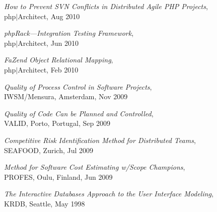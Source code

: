 \documentclass[12pt]{article}
\begin{document}
\emph{How to Prevent SVN Conflicts in Distributed Agile PHP Projects},\\
php$|$Architect, Aug 2010

\emph{phpRack---Integration Testing Framework},\\
php$|$Architect, Jun 2010

\emph{FaZend Object Relational Mapping},\\
php$|$Architect, Feb 2010

\emph{Quality of Process Control in Software Projects},\\
IWSM/Mensura, Amsterdam, Nov 2009

\emph{Quality of Code Can be Planned and Controlled},\\
VALID, Porto, Portugal, Sep 2009

\emph{Competitive Risk Identification Method for Distributed Teams},\\
SEAFOOD, Zurich, Jul 2009

\emph{Method for Software Cost Estimating w/Scope Champions},\\
PROFES, Oulu, Finland, Jun 2009

\emph{The Interactive Databases Approach to the User Interface Modeling},\\
KRDB, Seattle, May 1998
\end{document}
